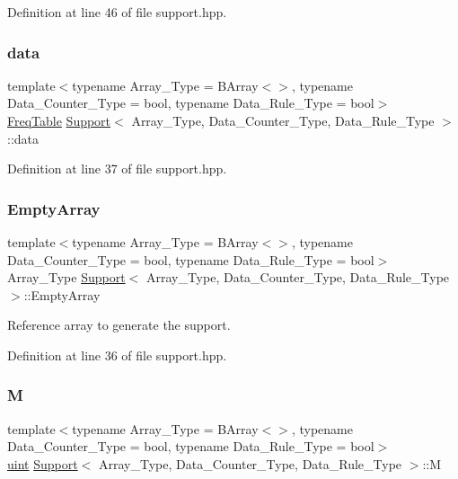Definition at line 46 of file support.\+hpp.

\mbox{\label{class_support_a1b7bc59cfcdd9bbdc164c6265917b030}} 
\subsubsection{\texorpdfstring{data}{data}}
{\footnotesize\ttfamily template$<$typename Array\+\_\+\+Type = B\+Array$<$$>$, typename Data\+\_\+\+Counter\+\_\+\+Type = bool, typename Data\+\_\+\+Rule\+\_\+\+Type = bool$>$ \\
\hyperlink{class_freq_table}{Freq\+Table} \hyperlink{class_support}{Support}$<$ Array\+\_\+\+Type, Data\+\_\+\+Counter\+\_\+\+Type, Data\+\_\+\+Rule\+\_\+\+Type $>$\+::data}



Definition at line 37 of file support.\+hpp.

\mbox{\label{class_support_a3ec1b46e245b89ae007601caaf4958c9}} 
\subsubsection{\texorpdfstring{Empty\+Array}{EmptyArray}}
{\footnotesize\ttfamily template$<$typename Array\+\_\+\+Type = B\+Array$<$$>$, typename Data\+\_\+\+Counter\+\_\+\+Type = bool, typename Data\+\_\+\+Rule\+\_\+\+Type = bool$>$ \\
Array\+\_\+\+Type \hyperlink{class_support}{Support}$<$ Array\+\_\+\+Type, Data\+\_\+\+Counter\+\_\+\+Type, Data\+\_\+\+Rule\+\_\+\+Type $>$\+::Empty\+Array}



Reference array to generate the support. 



Definition at line 36 of file support.\+hpp.

\mbox{\label{class_support_ac0662129b0a12fe4eac69f6f2e733b05}} 
\subsubsection{\texorpdfstring{M}{M}}
{\footnotesize\ttfamily template$<$typename Array\+\_\+\+Type = B\+Array$<$$>$, typename Data\+\_\+\+Counter\+\_\+\+Type = bool, typename Data\+\_\+\+Rule\+\_\+\+Type = bool$>$ \\
\hyperlink{typedefs_8hpp_a91ad9478d81a7aaf2593e8d9c3d06a14}{uint} \hyperlink{class_support}{Support}$<$ Array\+\_\+\+Type, Data\+\_\+\+Counter\+\_\+\+Type, Data\+\_\+\+Rule\+\_\+\+Type $>$\+::M}



